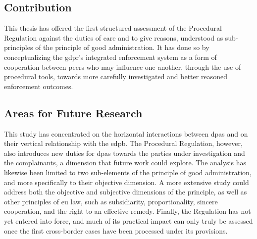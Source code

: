\subsection{Contribution}
\label{sec:ch7-contribution}
This thesis has offered the first structured assessment of the Procedural Regulation against the duties of care and to give reasons, understood as sub-principles of the principle of good administration.
It has done so by conceptualizing the \gls{gdpr}'s integrated enforcement system as a form of cooperation between peers who may influence one another, through the use of procedural tools, towards more carefully investigated and better reasoned enforcement outcomes.

\subsection{Areas for Future Research}
\label{sec:ch7-future-research}
This study has concentrated on the horizontal interactions between \glspl{dpa} and on their vertical relationship with the \gls{edpb}.
The Procedural Regulation, however, also introduces new duties for \glspl{dpa} towards the parties under investigation and the complainants, a dimension that future work could explore.
The analysis has likewise been limited to two sub-elements of the principle of good administration, and more specifically to their objective dimension.
A more extensive study could address both the objective and subjective dimensions of the principle, as well as other principles of \gls{eu} law, such as subsidiarity, proportionality, sincere cooperation, and the right to an effective remedy.
Finally, the Regulation has not yet entered into force, and much of its practical impact can only truly be assessed once the first cross-border cases have been processed under its provisions.